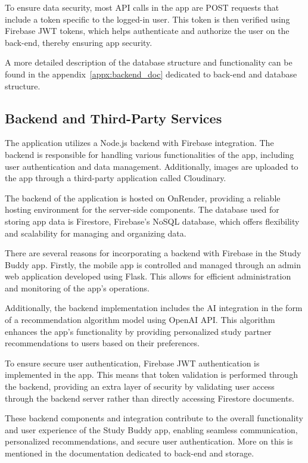 To ensure data security, most API calls in the app are POST requests that include a token specific to the logged-in user. This token is then verified using Firebase JWT tokens, which helps authenticate and authorize the user on the back-end, thereby ensuring app security.

A more detailed description of the database structure and functionality can be found in the appendix~\ref{appx:backend_doc} dedicated to back-end and database structure.
\subsection{Backend and Third-Party Services}
The application utilizes a Node.js backend with Firebase integration. The backend is responsible for handling various functionalities of the app, including user authentication and data management. Additionally, images are uploaded to the app through a third-party application called Cloudinary.

The backend of the application is hosted on OnRender, providing a reliable hosting environment for the server-side components. The database used for storing app data is Firestore, Firebase's NoSQL database, which offers flexibility and scalability for managing and organizing data.

There are several reasons for incorporating a backend with Firebase in the Study Buddy app. Firstly, the mobile app is controlled and managed through an admin web application developed using Flask. This allows for efficient administration and monitoring of the app's operations.

Additionally, the backend implementation includes the AI integration in the form of a recommendation algorithm model using OpenAI API. This algorithm enhances the app's functionality by providing personalized study partner recommendations to users based on their preferences.

To ensure secure user authentication, Firebase JWT authentication is implemented in the app. This means that token validation is performed through the backend, providing an extra layer of security by validating user access through the backend server rather than directly accessing Firestore documents.

These backend components and integration contribute to the overall functionality and user experience of the Study Buddy app, enabling seamless communication, personalized recommendations, and secure user authentication. More on this is mentioned in the documentation dedicated to back-end and storage.

